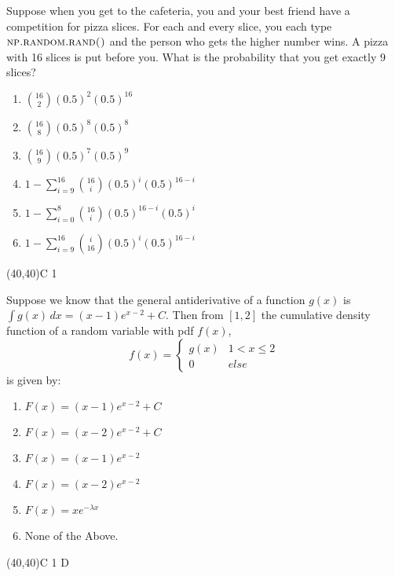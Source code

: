 \documentclass[addpoints]{exam}
\def\solutions{0}
\begin{document}
{\begin{questions}
\question[3] Suppose when you get to the cafeteria, you and your best friend have a competition for pizza slices. For each and every slice, you each type $\textsc{np.random.rand()}$ and the person who gets the higher number wins. A pizza with 16 slices is put before you.  What is the probability that you get exactly 9 slices?

\vspace{2mm}
\begin{minipage}[b]{.85\textwidth}
	\begin{enumerate}[label=\Alph*.]
		\item $ \displaystyle {16 \choose 2} (0.5)^2 (0.5)^16 $
		\item $ \displaystyle {16 \choose 8} (0.5)^8 (0.5)^8 $
		\item $ \displaystyle {16 \choose 9} (0.5)^7 (0.5)^9 $
		\item $ \displaystyle 1 - \sum_{i=9}^{16} {16 \choose i}(0.5)^i(0.5)^{16-i} $
		\item $ \displaystyle 1-\sum_{i=0}^8 {16 \choose i} (0.5)^{16-i} (0.5)^i $
		\item $ \displaystyle 1- \sum_{i=9}^{16} {i \choose 16}(0.5)^i(0.5)^{16-i}$
	\end{enumerate}
\end{minipage}
\begin{minipage}[b]{.1\textwidth}
	\vspace{\fill}\framebox(40,40){C \if\solutions1 \fi}
\end{minipage}

\question[3] Suppose we know that the general antiderivative of a function $g(x)$ is $\int g(x) \, dx = (x-1)e^{x-2}+C$.  Then from $[1,2]$ the cumulative density function of a random variable with pdf $f(x)$, $$f(x)=\begin{cases}
g(x) & 1<x \leq 2\\
0 & else
\end{cases}$$
is given by:
\vspace{2mm}

\begin{minipage}[b]{.85\textwidth}
	\begin{enumerate}[label=\Alph*.]
		\item $F(x) = (x-1)e^{x-2}+C$
		\item $F(x) = (x-2)e^{x-2}+C$
		\item $F(x) = (x-1)e^{x-2}$
		\item $F(x) = (x-2)e^{x-2}$
		\item $F(x) = x e^{-\lambda x}$
		\item None of the Above.
	\end{enumerate}
\end{minipage}
\begin{minipage}[b]{.1\textwidth}
	\vspace{\fill}\framebox(40,40){C \if\solutions1 D \fi}
\end{minipage}
\vspace{3mm}


\end{questions}}
\end{document}
